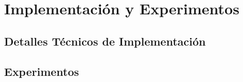 \chapter{Implementación y Experimentos} 
\section{Detalles Técnicos de Implementación} 
\section{Experimentos} 
